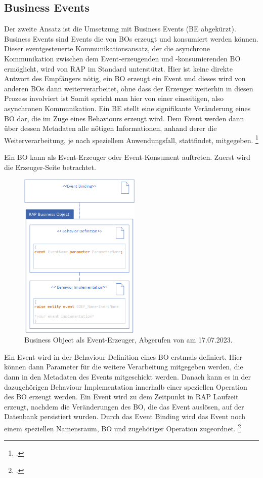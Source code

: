 \subsection{Business Events}

Der zweite Ansatz ist die Umsetzung mit Business Events (BE abgekürzt). Business Events sind Events die von BOs erzeugt und konsumiert werden können. Dieser eventgesteuerte Kommunikationsansatz, der die asynchrone Kommunikation zwischen dem Event-erzeugenden und -konsumierenden BO ermöglicht, wird von RAP im Standard unterstützt. Hier ist keine direkte Antwort des Empfängers nötig, ein BO erzeugt ein Event und dieses wird von anderen BOs dann weiterverarbeitet, ohne dass der Erzeuger weiterhin in diesen Prozess involviert ist Somit spricht man hier von einer einseitigen, also asynchronen Kommunikation. 
Ein BE stellt eine signifikante Veränderung eines BO dar, die im Zuge eines Behaviours erzeugt wird. Dem Event werden dann über dessen Metadaten alle nötigen Informationen, anhand derer die Weiterverarbeitung, je nach speziellem Anwendungsfall, stattfindet, mitgegeben. \footcite[Vgl.][]{sap_business-events_2023}

Ein BO kann als Event-Erzeuger oder Event-Konsument auftreten. Zuerst wird die Erzeuger-Seite betrachtet.

\begin{figure}[H]
 \centering
 \includegraphics[height=8cm]{Bilder/Business-Events_BO-as-event-consumer.png}
 \caption[Business Object als Event-Erzeuger]{Business Object als Event-Erzeuger, Abgerufen von \cite{sap_business-events_2023} am 17.07.2023.}
 \label{fig:iso_norm}
\end{figure}

Ein Event wird in der Behaviour Definition eines BO erstmals definiert. Hier können dann Parameter für die weitere Verarbeitung mitgegeben werden, die dann in den Metadaten des Events mitgeschickt werden. Danach kann es in der dazugehörigen Behaviour Implementation innerhalb einer speziellen Operation des BO erzeugt werden. Ein Event wird zu dem Zeitpunkt in RAP Laufzeit erzeugt, nachdem die Veränderungen des BO, die das Event auslösen, auf der Datenbank persistiert wurden. Durch das Event Binding wird das Event noch einem speziellen Namensraum, BO und zugehöriger Operation zugeordnet. \footcite[Vgl.][]{sap_business-events_2023}

